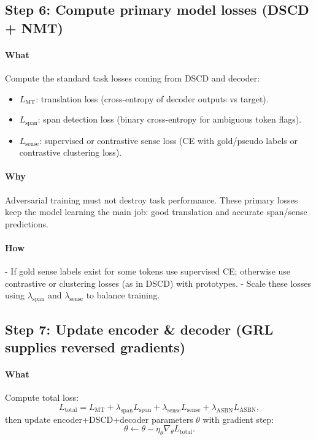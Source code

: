 \documentclass[11pt]{article}
\begin{document}
\subsection*{Step 6: Compute primary model losses (DSCD + NMT)}
\paragraph{What}
Compute the standard task losses coming from DSCD and decoder:
\begin{itemize}
  \item $L_{\text{MT}}$: translation loss (cross-entropy of decoder outputs vs target).
  \item $L_{\text{span}}$: span detection loss (binary cross-entropy for ambiguous token flags).
  \item $L_{\text{sense}}$: supervised or contrastive sense loss (CE with gold/pseudo labels or contrastive clustering loss).
\end{itemize}

\paragraph{Why}
Adversarial training must not destroy task performance. These primary losses keep the model learning the main job: good translation and accurate span/sense predictions.

\paragraph{How}
- If gold sense labels exist for some tokens use supervised CE; otherwise use contrastive or clustering losses (as in DSCD) with prototypes.  
- Scale these losses using $\lambda_{\text{span}}$ and $\lambda_{\text{sense}}$ to balance training.

\subsection*{Step 7: Update encoder \& decoder (GRL supplies reversed gradients)}
\paragraph{What}
Compute total loss:
\[
L_{\text{total}} = L_{\text{MT}} + \lambda_{\text{span}}L_{\text{span}} + \lambda_{\text{sense}}L_{\text{sense}} + \lambda_{\text{ASBN}}L_{\text{ASBN}},
\]
then update encoder+DSCD+decoder parameters $\theta$ with gradient step:
\[
\theta \leftarrow \theta - \eta_\theta \nabla_\theta L_{\text{total}}.
\]
\end{document}
